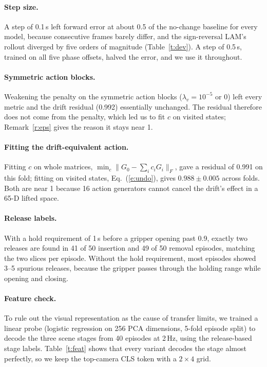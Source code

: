 \documentclass{jcse}
\begin{document}
\paragraph{Step size.}
A step of 0.1\,s left forward error at about 0.5 of the no-change baseline for every model, because consecutive frames barely differ, and the sign-reversal LAM's rollout diverged by five orders of magnitude (Table~\ref{t:dev}).
A step of 0.5\,s, trained on all five phase offsets, halved the error, and we use it throughout.

\paragraph{Symmetric action blocks.}
Weakening the penalty on the symmetric action blocks ($\lambda_v=10^{-5}$ or 0) left every metric and the drift residual (0.992) essentially unchanged.
The residual therefore does not come from the penalty, which led us to fit $c$ on visited states; Remark~\ref{r:eps} gives the reason it stays near 1.

\paragraph{Fitting the drift-equivalent action.}
Fitting $c$ on whole matrices, $\min_c\|G_0-\sum_ic_iG_i\|_F$, gave a residual of 0.991 on this fold; fitting on visited states, Eq.~(\ref{e:undo}), gives $0.988\pm0.005$ across folds.
Both are near 1 because 16 action generators cannot cancel the drift's effect in a 65-D lifted space.

\paragraph{Release labels.}
With a hold requirement of 1\,s before a gripper opening past 0.9, exactly two releases are found in 41 of 50 insertion and 49 of 50 removal episodes, matching the two slices per episode.
Without the hold requirement, most episodes showed 3--5 spurious releases, because the gripper passes through the holding range while opening and closing.

\paragraph{Feature check.}
To rule out the visual representation as the cause of transfer limits, we trained a linear probe (logistic regression on 256 PCA dimensions, 5-fold episode split) to decode the three scene stages from 40 episodes at 2\,Hz, using the release-based stage labels.
Table~\ref{t:feat} shows that every variant decodes the stage almost perfectly, so we keep the top-camera CLS token with a $2\times4$ grid.
\end{document}
